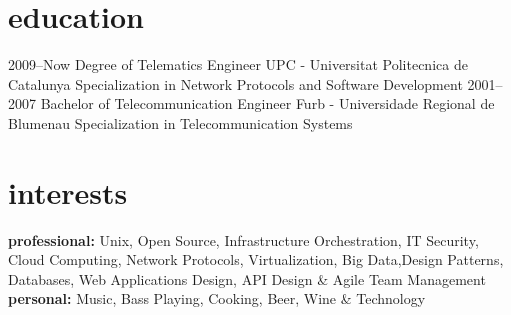 \documentclass[]{friggeri-cv} %
\begin{document}
\section{education}

\begin{entrylist}
\entry
{2009--Now}
{Degree {\normalfont of Telematics Engineer}}
{UPC - Universitat Politecnica de Catalunya}
{Specialization in Network Protocols and Software Development}
\entry
{2001--2007}
{Bachelor {\normalfont of Telecommunication Engineer}}
{Furb -  Universidade Regional de Blumenau}
{Specialization in Telecommunication Systems}
\end{entrylist}

\section{interests}

\textbf{professional:} Unix, Open Source, Infrastructure Orchestration, IT Security, Cloud Computing, Network Protocols, Virtualization, Big Data,Design Patterns, Databases, Web Applications Design, API Design \& Agile Team Management \\ 
\textbf{personal:} Music, Bass Playing, Cooking, Beer, Wine \& Technology 
\end{document}
